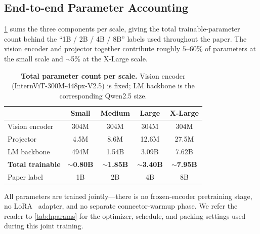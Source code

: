 \subsection{End-to-end Parameter Accounting}\label{app:arch-totals}

\cref{tab:arch-totals} sums the three components per scale, giving the total trainable-parameter count behind the ``1B / 2B / 4B / 8B'' labels used throughout the paper. The vision encoder and projector together contribute roughly $5$--$60$\% of parameters at the small scale and $\sim$5\% at the X-Large scale.

\begin{table}[!h]
\centering
\caption{\textbf{Total parameter count per scale.} Vision encoder (InternViT-300M-448px-V2.5) is fixed; LM backbone is the corresponding Qwen2.5 size.}
\label{tab:arch-totals}
\small
\begin{tabular}{lcccc}
\toprule
& \textbf{Small} & \textbf{Medium} & \textbf{Large} & \textbf{X-Large} \\
\midrule
Vision encoder & 304M & 304M & 304M & 304M \\
Projector & 4.5M & 8.6M & 12.6M & 27.5M \\
LM backbone & 494M & 1.54B & 3.09B & 7.62B \\
\midrule
\textbf{Total trainable} & \textbf{$\sim$0.80B} & \textbf{$\sim$1.85B} & \textbf{$\sim$3.40B} & \textbf{$\sim$7.95B} \\
Paper label & 1B & 2B & 4B & 8B \\
\bottomrule
\end{tabular}
\end{table}

All parameters are trained jointly---there is no frozen-encoder pretraining stage, no LoRA~\citep{hu2022lora} adapter, and no separate connector-warmup phase. We refer the reader to \cref{tab:hparams} for the optimizer, schedule, and packing settings used during this joint training.
